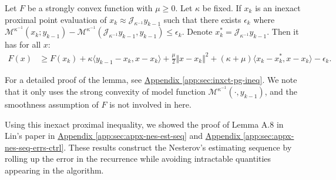 \documentclass[12pt]{article}
\begin{document}
    \begin{lemma}\label{lemma:lin-ixct-prox-ineq}
        Let $F$ be a strongly convex function with $\mu\ge 0$. 
        Let $\kappa$ be fixed. 
        If $x_k$ is an inexact proximal point evaluation of $x_k \approx \mathcal J_{\kappa^{-1}} y_{k - 1}$ such that there exists $\epsilon_k$ where $\mathcal M^{\kappa^{-1}}(x_k; y_{k - 1}) - \mathcal M^{\kappa^{-1}}(\mathcal J_{\kappa^{-1}} y_{k - 1}, y_{k - 1}) \le \epsilon_k$. 
        Denote $x_k^* = \mathcal J_{\kappa^{-1}} y_{k - 1}$. Then it has for all $x$: 
        \begin{align*}
            F(x) &\ge 
            F(x_k) + \kappa \langle y_{k - 1} - x_k, x - x_k\rangle
            + \frac{\mu}{2}\Vert x - x_k\Vert^2 
            + (\kappa + \mu)\langle  x_k - x_k^*, x - x_k\rangle 
            - \epsilon_k.
        \end{align*}
    \end{lemma}
    \begin{remark}
        For a detailed proof of the lemma, see 
        \hyperref[app:sec:inxct-pg-ineq]{Appendix \ref*{app:sec:inxct-pg-ineq}}. 
        We note that it only uses the strong convexity of model function $\mathcal M^{\kappa^{-1}}(\cdot, y_{k - 1})$, and the smoothness assumption of $F$ is not involved in here. 
    \end{remark}
    Using this inexact proximal inequality, we showed the proof of Lemma A.8 in Lin's paper \cite{lin_universal_2015} in 
    \hyperref[app:sec:appx-nes-est-seq]{Appendix \ref*{app:sec:appx-nes-est-seq}}
    and 
    \hyperref[app:sec:appx-nes-seq-errs-ctrl]{Appendix \ref*{app:sec:appx-nes-seq-errs-ctrl}}. 
    These results construct the Nesterov's estimating sequence by rolling up the error in the recurrence while avoiding intractable quantities appearing in the algorithm. 
    


    
\end{document}
